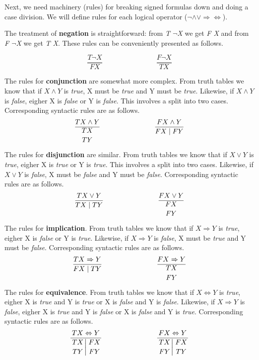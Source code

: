\documentclass{article}
\begin{document}
	\par
	Next, we need machinery (rules) for breaking signed formulas down and doing a case division. We will define rules for each logical operator ($\neg \land \lor \Rightarrow \Leftrightarrow$).

	\par
	The treatment of \textbf{negation} is straightforward: from \textit{T $\neg$X} we get \textit{F X} and from \textit{F $\neg$X} we get \textit{T X}. These rules can be conveniently presented as follows.

	\[
		\frac{T \neg X}{F X}\;\;\;\;\;\;\;\;\;\;\;\;\;\;\;\;\;\;\;\;\;\;\;\;\;\;\;\ \frac{F \neg X}{T X}
	\]

	\par

	The rules for \textbf{conjunction} are somewhat more complex. From truth tables we know that if $X \land Y$ is \textit{true}, X must be \textit{true} and Y must be \textit{true}. Likewise, if $X \land Y$ is \textit{false}, eigher X is \textit{false} or Y is \textit{false}. This involves a split into two cases. Corresponding syntactic rules are as follows.
	\[
		\frac{T X \land Y}{\displaystyle{T X \atop T Y}}\;\;\;\;\;\;\;\;\;\;\;\;\;\;\;\;\;\;\;\;\;\;\;\;\;\;\;\ \frac{F X \land Y}{F X \mid F Y}
	\]

	The rules for \textbf{disjunction} are similar. From truth tables we know that if $X \lor Y$ is \textit{true}, eigher X is \textit{true} or Y is \textit{true}. This involves a split into two cases. Likewise, if $X \lor Y$ is \textit{false}, X must be \textit{false} and Y must be \textit{false}. Corresponding syntactic rules are as follows.
	\[
		\frac{T X \lor Y}{T X \mid T Y}\;\;\;\;\;\;\;\;\;\;\;\;\;\;\;\;\;\;\;\;\;\;\;\;\;\;\;\ \frac{F X \lor Y}{\displaystyle{F X \atop F Y}}
	\]

	\par
	The rules for \textbf{implication}. From truth tables we know that if $X \Rightarrow Y$ is \textit{true}, eigher X is \textit{false} or Y is \textit{true}. Likewise, if $X \Rightarrow Y$ is \textit{false}, X must be \textit{true} and Y must be \textit{false}. Corresponding syntactic rules are as follows.
	\[
		\frac{T X \Rightarrow Y}{F X \mid T Y}\;\;\;\;\;\;\;\;\;\;\;\;\;\;\;\;\;\;\;\;\;\;\;\;\;\;\;\ \frac{F X \Rightarrow Y}{\displaystyle{T X \atop F Y}}
	\]

	\par
	The rules for \textbf{equivalence}. From truth tables we know that if $X \Leftrightarrow Y$ is \textit{true}, eigher X is \textit{true} and Y is \textit{true} or X is \textit{false} and Y is \textit{false}. Likewise, if $X \Rightarrow Y$ is \textit{false}, eigher X is \textit{true} and Y is \textit{false} or X is \textit{false} and Y is \textit{true}. Corresponding syntactic rules are as follows.
	\[
		\frac{T X \Leftrightarrow Y}{\left.\displaystyle{T X \atop T Y}\right\vert\displaystyle{F X \atop F Y}}\;\;\;\;\;\;\;\;\;\;\;\;\;\;\;\;\;\;\;\;\;\;\;\;\;\;\;\ \frac{F X \Leftrightarrow Y}{\left.\displaystyle{T X \atop F Y}\right\vert\displaystyle{F X \atop T Y}}
	\]
\end{document}
